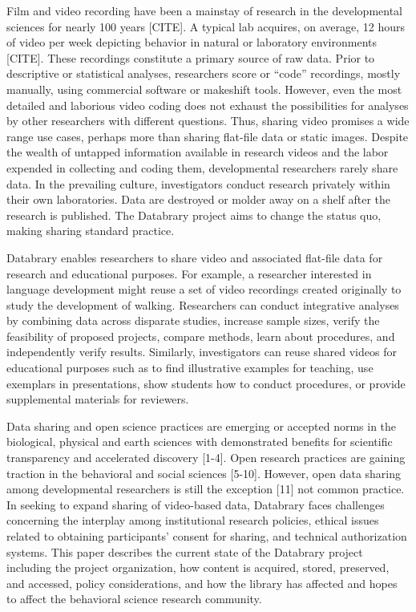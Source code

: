 \documentclass{sig-alternate}
\begin{document}
Film and video recording have been a mainstay of research in the
developmental sciences for nearly 100 years [CITE]. A typical lab
acquires, on average, 12 hours of video per week depicting behavior in
natural or laboratory environments [CITE]. These recordings constitute a
primary source of raw data. Prior to descriptive or statistical
analyses, researchers score or “code” recordings, mostly manually, using
commercial software or makeshift tools. However, even the most detailed
and laborious video coding does not exhaust the possibilities for
analyses by other researchers with different questions. Thus, sharing
video promises a wide range use cases, perhaps more than sharing
flat-file data or static images. Despite the wealth of untapped
information available in research videos and the labor expended in
collecting and coding them, developmental researchers rarely share data.
In the prevailing culture, investigators conduct research privately
within their own laboratories. Data are destroyed or molder away on a
shelf after the research is published. The Databrary project aims to
change the status quo, making sharing standard practice.

Databrary enables researchers to share video and associated flat-file
data for research and educational purposes. For example, a researcher
interested in language development might reuse a set of video recordings
created originally to study the development of walking. Researchers can
conduct integrative analyses by combining data across disparate studies,
increase sample sizes, verify the feasibility of proposed projects,
compare methods, learn about procedures, and independently verify
results. Similarly, investigators can reuse shared videos for
educational purposes such as to find illustrative examples for teaching,
use exemplars in presentations, show students how to conduct procedures,
or provide supplemental materials for reviewers.

Data sharing and open science practices are emerging or accepted norms
in the biological, physical and earth sciences with demonstrated
benefits for scientific transparency and accelerated discovery [1-4].
Open research practices are gaining traction in the behavioral and
social sciences [5-10]. However, open data sharing among developmental
researchers is still the exception [11] not common practice. In seeking
to expand sharing of video-based data, Databrary faces challenges
concerning the interplay among institutional research policies, ethical
issues related to obtaining participants’ consent for sharing, and
technical authorization systems. This paper describes the current state
of the Databrary project including the project organization, how content
is acquired, stored, preserved, and accessed, policy considerations, and
how the library has affected and hopes to affect the behavioral science
research community.
\end{document}
